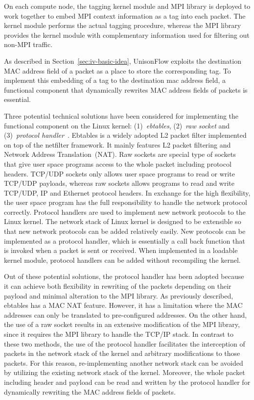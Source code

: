 On each compute node, the tagging kernel module and MPI library is deployed to
work together to embed MPI context information as a tag into each packet. The
kernel module performs the actual tagging procedure, whereas the MPI library
provides the kernel module with complementary information used for filtering
out non-MPI traffic.

As described in Section~\ref{sec:iv-basic-idea}, UnisonFlow exploits the
destination MAC address field of a packet as a place to store the
corresponding tag. To implement this embedding of a tag to the destination mac
address field, a functional component that dynamically rewrites MAC address
fields of packets is essential.


Three potential technical solutions have been considered for implementing
the functional component on the Linux kernel: (1)~\emph{ebtables},
(2)~\emph{raw socket} and (3)~\emph{protocol handler}~\autocite{Rosen2013}.
Ebtables is a widely adopted L2 packet filter
implemented on top of the netfilter framework. It mainly features L2 packet
filtering and Network Address Translation~(NAT). Raw sockets are special type
of sockets that give user space programs access to the whole packet including
protocol headers. TCP/UDP sockets only allows user space programs to read or
write TCP/UDP payloads, whereas raw sockets allows programs to read and write
TCP/UDP, IP and Ethernet protocol headers. In exchange for the high
flexibility, the user space program has the full responsibility to handle the
network protocol correctly. Protocol handlers are used to implement new
network protocols to the Linux kernel. The network stack of Linux kernel is
designed to be extensible so that new network protocols can be added
relatively easily. New protocols can be implemented as a protocol handler,
which is essentially a call back function that is invoked when a packet is
sent or received. When implemented in a loadable kernel module, protocol
handlers can be added without recompiling the kernel.

Out of these potential solutions,
the protocol handler has been adopted because it can achieve both
flexibility in rewriting of the packets depending on their payload and
minimal alteration to the MPI library. As previously described, ebtables
has a MAC NAT feature. However, it has a limitation where the MAC
addresses can only be translated to pre-configured addresses. On the
other hand, the use of a raw socket results in an extensive modification
of the MPI library, since it requires the MPI library to handle the
TCP/IP stack. In contrast to these two methods, the use of the protocol
handler facilitates the interception of packets in the network stack of
the kernel and arbitrary modifications to those packets. For this reason,
re-implementing another network stack can be avoided by utilizing the existing
network stack of the kernel. Moreover, the whole packet including header and
payload can be read and written by the protocol handler for dynamically
rewriting the MAC address fields of packets.

